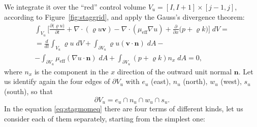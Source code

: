 We integrate it over the ``red'' control volume $V_u=[I, I+1]\times[j-1,j]$, 
according to Figure~\ref{fig:staggrid}, and apply the Gauss's divergence 
theorem:
\begin{multline} \label{eq:stagmomeq}
\int_{V_u} \bigg[ \frac{\partial{(\varrho u})}{\partial t} + \nabla 
\cdot (\varrho u \mathbf{v} ) - \nabla \cdot (\mu_\text{eff} \nabla u) + 
\frac{\partial}{\partial x}\big( p + \varrho k \big) \bigg ]\; dV 
=\\
=\frac{d}{dt} \int_{V_u} \varrho u\; dV + \int_{\partial V_u} \varrho u 
(\mathbf{v} \cdot \mathbf{n}) \; dA -\\
- \int_{\partial V_u} \mu_\text{eff} 
(\nabla u \cdot \mathbf{n}) \; dA + \int_{\partial V_u} (p + \varrho k) n_x \; 
dA = 0,
\end{multline}
where $n_x$ is the component in the $x$ direction of the outward unit 
normal $\mathbf{n}$. Let us identify again the four edges of $\partial V_u$ 
with $e_u$ (east), $n_u$ (north), $w_u$ (west), $s_u$ (south), so that
\begin{equation}
	\partial V_u = e_u \cap n_u \cap w_u \cap s_u.
\end{equation}
In the equation \eqref{eq:stagmomeq} there are four terms of different kinds, 
let us consider each of them separately, starting from the simplest one:
